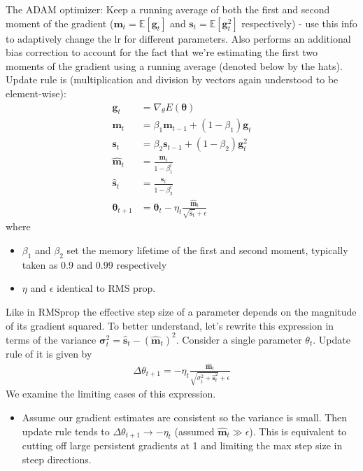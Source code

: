 \documentclass[norsk,a4paper,11pt]{article}
\begin{document}
\begin{itemize}
		The ADAM optimizer: Keep a running average of both the first and second moment of the gradient ($\mathbf{m}_t = \mathbb{E}[\mathbf{g}_t]$ and $\mathbf{s}_t = \mathbb{E}[\mathbf{g}_t^2]$ respectively) - use this info to adaptively change the lr for different parameters. Also performs an additional bias correction to account for the fact that we're estimating the first two moments of the gradient using a running average (denoted below by the hats). Update rule is (multiplication and division by vectors again understood to be element-wise):
		\begin{align}
			\mathbf{g}_t &= \nabla_\theta E(\bm{\theta}) \\
			\mathbf{m}_t &= \beta_1 \mathbf{m}_{t-1} + (1-\beta_1) \mathbf{g}_t \\
			\mathbf{s}_t &= \beta_2 \mathbf{s}_{t-1} + (1-\beta_2) \mathbf{g}_t^2 \\
			\hat{\mathbf{m}}_t &= \frac{\mathbf{m}_t}{1-\beta_1^t} \\
			\hat{\mathbf{s}}_t &= \frac{\mathbf{s}_t}{1-\beta_2^t} \\
			\bm{\theta}_{t+1} &= \bm{\theta}_t - \eta_t \frac{\hat{\mathbf{m}}_t}{\sqrt{\hat{\mathbf{s}}_t} + \epsilon}
		\end{align}
		where
		\begin{itemize}
			\item $\beta_1$ and $\beta_2$ set the memory lifetime of the first and second moment, typically taken as 0.9 and 0.99 respectively
			\item $\eta$ and $\epsilon$ identical to RMS prop.
		\end{itemize}
		Like in RMSprop the effective step size of a parameter depends on the magnitude of its gradient squared. To better understand, let's rewrite this expression in terms of the variance $\mathbf{\sigma}_t^2 = \hat{\mathbf{s}}_t  - (\hat{\mathbf{m}}_t)^2$. Consider a single parameter $\theta_t$. Update rule of it is given by
		\begin{align}
			\Delta \theta_{t+1} = -\eta_t \frac{\hat{\mathbf{m}}_t}{\sqrt{\sigma_t^2 + \hat{\mathbf{s}}_t^2} + \epsilon}
		\end{align}
		We examine the limiting cases of this expression. 
		\begin{itemize}
			\item Assume our gradient estimates are consistent so the variance is small. Then update rule tends to $\Delta \theta_{t+1} \rightarrow -\eta_t$ (assumed $\hat{\mathbf{m}}_t \gg \epsilon$). This is equivalent to cutting off large persistent gradients at 1 and limiting the max step size in steep directions.

\end{itemize}
\end{itemize}
\end{document}
